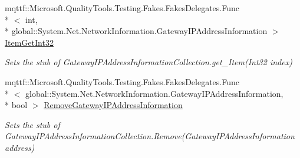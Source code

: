 \begin{DoxyCompactItemize}
mqttf\-::\-Microsoft.\-Quality\-Tools.\-Testing.\-Fakes.\-Fakes\-Delegates.\-Func\\*
$<$ int, \\*
global\-::\-System.\-Net.\-Network\-Information.\-Gateway\-I\-P\-Address\-Information $>$ \hyperlink{class_system_1_1_net_1_1_network_information_1_1_fakes_1_1_stub_gateway_i_p_address_information_collection_ac25b03aaab199bc9325baf45a7bf9a79}{Item\-Get\-Int32}
\begin{DoxyCompactList}\small\item\em Sets the stub of Gateway\-I\-P\-Address\-Information\-Collection.\-get\-\_\-\-Item(\-Int32 index)\end{DoxyCompactList}\item 
mqttf\-::\-Microsoft.\-Quality\-Tools.\-Testing.\-Fakes.\-Fakes\-Delegates.\-Func\\*
$<$ global\-::\-System.\-Net.\-Network\-Information.\-Gateway\-I\-P\-Address\-Information, \\*
bool $>$ \hyperlink{class_system_1_1_net_1_1_network_information_1_1_fakes_1_1_stub_gateway_i_p_address_information_collection_a681eed1695ab221e391de31adb51d281}{Remove\-Gateway\-I\-P\-Address\-Information}
\begin{DoxyCompactList}\small\item\em Sets the stub of Gateway\-I\-P\-Address\-Information\-Collection.\-Remove(\-Gateway\-I\-P\-Address\-Information address)\end{DoxyCompactList}\end{DoxyCompactItemize}
